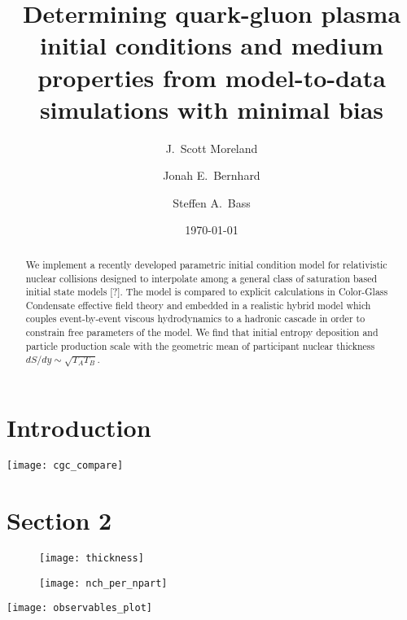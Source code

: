 \documentclass[aps,prc,reprint,amsmath]{revtex4-1}
\begin{document}
\title{Determining quark-gluon plasma initial conditions and medium \\ properties from model-to-data simulations with minimal bias}

\author{J.\ Scott Moreland}
\author{Jonah E.\ Bernhard}
\author{Steffen A.\ Bass}

\date{\today}


\begin{abstract}
  We implement a recently developed parametric initial condition model for relativistic nuclear collisions designed to interpolate among a general class of saturation based initial state models [?]. The model is compared to explicit calculations in Color-Glass Condensate effective field theory and embedded in a realistic hybrid model which couples event-by-event viscous hydrodynamics to a hadronic cascade in order to constrain free parameters of the model. We find that initial entropy deposition and particle production scale with the geometric mean of participant nuclear thickness $dS/dy \sim \sqrt{T_A T_B}$. 
\end{abstract}


\maketitle


\section{Introduction}

\lipsum[1-7]

\begin{figure*}
    \texttt{[image: cgc\_compare]}
\end{figure*}

\lipsum[3-8]
\section{Section 2}


\begin{figure}[b]
    \texttt{[image: thickness]}
\end{figure}

\begin{figure}
    \texttt{[image: nch\_per\_npart]}
\end{figure}
\lipsum[5-10]

\begin{figure*}
    \texttt{[image: observables\_plot]}
\end{figure*}
\lipsum[5-8]
\end{document}
